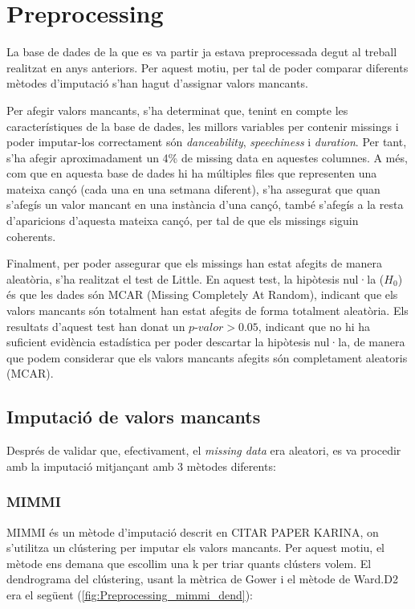 \section{Preprocessing}
La base de dades de la que es va partir ja estava preprocessada degut al treball realitzat en anys anteriors. Per aquest motiu, per tal de poder comparar diferents mètodes d'imputació s'han hagut d'assignar valors mancants.

Per afegir valors mancants, s'ha determinat que, tenint en compte les característiques de la base de dades, les millors variables per contenir missings i poder imputar-los correctament són \textit{danceability}, \textit{speechiness} i \textit{duration}. Per tant, s'ha afegir aproximadament un 4\% de missing data en aquestes columnes. A més, com que en aquesta base de dades hi ha múltiples files que representen una mateixa cançó (cada una en una setmana diferent), s'ha assegurat que quan s'afegís un valor mancant en una instància d'una cançó, també s'afegís a la resta d'aparicions d'aquesta mateixa cançó, per tal de que els missings siguin coherents.

Finalment, per poder assegurar que els missings han estat afegits de manera aleatòria, s'ha realitzat el test de Little. En aquest test, la hipòtesis nul·la ($H_0$) és que les dades són MCAR (Missing Completely At Random), indicant que els valors mancants són totalment han estat afegits de forma totalment aleatòria. Els resultats d'aquest test han donat un $\textit{p-valor} > 0.05$, indicant que no hi ha suficient evidència estadística per poder descartar la hipòtesis nul·la, de manera que podem considerar que els valors mancants afegits són completament aleatoris (MCAR).

\subsection{Imputació de valors mancants}
Després de validar que, efectivament, el \textit{missing data} era aleatori, es va procedir amb la imputació mitjançant amb 3 mètodes diferents:

\subsubsection{MIMMI}

MIMMI és un mètode d'imputació descrit en CITAR PAPER KARINA, on s'utilitza un clústering per imputar els valors mancants. Per aquest motiu, el mètode ens demana que escollim una k per triar quants clústers volem. El dendrograma del clústering, usant la mètrica de Gower i el mètode de Ward.D2 era el següent (\ref{fig:Preprocessing_mimmi_dend}):

